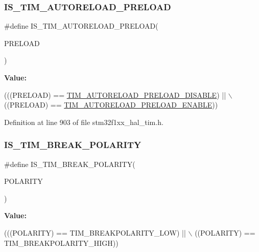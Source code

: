 \subsubsection{\texorpdfstring{I\+S\+\_\+\+T\+I\+M\+\_\+\+A\+U\+T\+O\+R\+E\+L\+O\+A\+D\+\_\+\+P\+R\+E\+L\+O\+AD}{IS\_TIM\_AUTORELOAD\_PRELOAD}}
{\footnotesize\ttfamily \#define I\+S\+\_\+\+T\+I\+M\+\_\+\+A\+U\+T\+O\+R\+E\+L\+O\+A\+D\+\_\+\+P\+R\+E\+L\+O\+AD(\begin{DoxyParamCaption}\item[{}]{P\+R\+E\+L\+O\+AD }\end{DoxyParamCaption})}

{\bfseries Value\+:}
\begin{DoxyCode}
(((PRELOAD) == \hyperlink{group___t_i_m___auto_reload_preload_ga4d0cf7e2800d0ab10f3f0ebfac11c9c7}{TIM\_AUTORELOAD\_PRELOAD\_DISABLE}) || \(\backslash\)
                                            ((PRELOAD) == 
      \hyperlink{group___t_i_m___auto_reload_preload_gaaa36f0c74b1d1ec83b0c105bfedfa309}{TIM\_AUTORELOAD\_PRELOAD\_ENABLE}))
\end{DoxyCode}


Definition at line 903 of file stm32f1xx\+\_\+hal\+\_\+tim.\+h.

\mbox{\label{group___t_i_m___private___macros_gaa29e33e74c5ff10972357ddd3f47f078}} 
\subsubsection{\texorpdfstring{I\+S\+\_\+\+T\+I\+M\+\_\+\+B\+R\+E\+A\+K\+\_\+\+P\+O\+L\+A\+R\+I\+TY}{IS\_TIM\_BREAK\_POLARITY}}
{\footnotesize\ttfamily \#define I\+S\+\_\+\+T\+I\+M\+\_\+\+B\+R\+E\+A\+K\+\_\+\+P\+O\+L\+A\+R\+I\+TY(\begin{DoxyParamCaption}\item[{}]{P\+O\+L\+A\+R\+I\+TY }\end{DoxyParamCaption})}

{\bfseries Value\+:}
\begin{DoxyCode}
(((POLARITY) == TIM\_BREAKPOLARITY\_LOW) || \(\backslash\)
                                         ((POLARITY) == TIM\_BREAKPOLARITY\_HIGH))
\end{DoxyCode}


